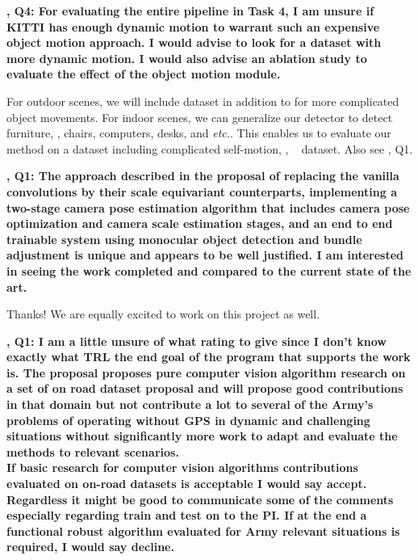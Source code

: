 \documentclass[12pt]{article}
\newcommand{\revOne}{{\color{red}{R1}}}
\newcommand{\revTwo}{{\color{orange}{R2}}}
\newcommand{\revThree}{{\color{my_magenta}{R3}}}
\begin{document}
    
    \textbf{\revOne, Q4: For evaluating the entire pipeline in Task 4, I am unsure if KITTI has enough dynamic motion to warrant such an expensive object motion approach. I would advise to look for a dataset with more dynamic motion. I would also advise an ablation study to evaluate the effect of the object motion module.}

    For outdoor scenes, we will include \argoverseTwo \cite{wilson2023argoverse} dataset in addition to \kitti for more complicated object movements.
    For indoor scenes, we can generalize our detector to detect furniture, \eg, chairs, computers, desks, and \textit{etc.}.
    This enables us to evaluate our method on a dataset including complicated self-motion, \eg, \scannet~\cite{dai2017scannet} dataset.
    Also see \revThree, Q1.

\clearpage

    \textbf{\revTwo, Q1: The approach described in the proposal of replacing the vanilla convolutions by their scale equivariant counterparts, implementing a two-stage camera pose estimation algorithm that includes camera pose optimization and camera scale estimation stages, and an end to end trainable system using monocular object detection and bundle adjustment is unique and appears to be well justified. I am interested in seeing the work completed and compared to the current state of the art.}

    Thanks! We are equally excited to work on this project as well.

\clearpage

    \textbf{\revThree, Q1: I am a little unsure of what rating to give since I don’t know exactly what TRL the end goal of the program that supports the work is. The proposal proposes pure computer vision algorithm research on a set of on road dataset proposal and will propose good contributions in that domain but not contribute a lot to several of the Army’s problems of operating without GPS in dynamic and challenging situations without significantly more work to adapt and evaluate the methods to relevant scenarios. \\
    If basic research for computer vision algorithms contributions evaluated on on-road datasets is acceptable I would say accept. Regardless it might be good to communicate some of the comments especially regarding train and test on \kitti to the PI.
    If at the end a functional robust algorithm evaluated for Army relevant situations is required, I would say decline.
}
\end{document}
